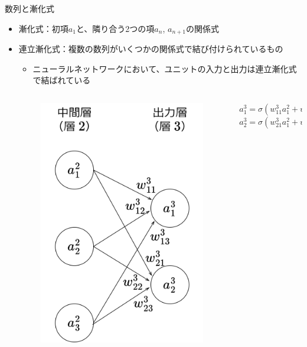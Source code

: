 \documentclass[dvipdfmx,aspectratio=169]{beamer}
\begin{document}
	\begin{frame}{数列と漸化式}
		\begin{itemize}
			\item \alert{漸化式}：初項$ a_1 $と、隣り合う2つの項$ a_n $, $ a_{n+1} $の関係式
			\item \alert{連立漸化式}：複数の数列がいくつかの関係式で結び付けられているもの
			\begin{itemize}
				\item ニューラルネットワークにおいて、ユニットの入力と出力は連立漸化式で結ばれている
			\end{itemize}
		\end{itemize}
		\begin{columns}
			\begin{column}{0.1\linewidth}
			\end{column}
			\begin{column}{0.4\linewidth}
				\begin{figure}
					\centering
					\includegraphics[width=0.5\linewidth]{img/example-of-simultaneous-asymptotic-formulas}
				\end{figure}
			\end{column}
			\begin{column}{0.5\linewidth}
				$ a^3_1 = \sigma(w^3_{11}a^2_1 + w^3_{12}a^2_2 + w^3_{13}a^2_3 + b^3_1) $\\
				$ a^3_2 = \sigma(w^3_{21}a^2_1 + w^3_{22}a^2_2 + w^3_{23}a^2_3 + b^3_2) $
			\end{column}
		\end{columns}
	\end{frame}
\end{document}
